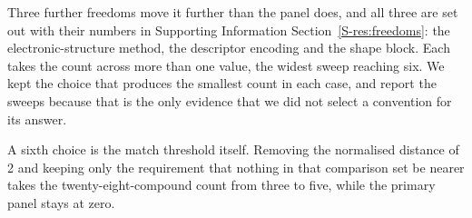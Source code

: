 \documentclass[journal=jacsat,manuscript=article,margin=1in]{achemso}
\begin{document}
Three further freedoms move it further than the panel does, and all three are
set out with their numbers in Supporting Information
Section~\ref{S-res:freedoms}: the electronic-structure method, the descriptor
encoding and the shape block. Each takes the count across more than one value,
the widest sweep reaching six. We kept the choice that produces the smallest
count in each case, and report the sweeps because that is the only evidence
that we did not select a convention for its answer.

A sixth choice is the match threshold itself. Removing the normalised distance
of 2 and keeping only the requirement that nothing in that comparison set
be nearer takes the twenty-eight-compound count from three to five, while the
primary panel stays at zero.
\end{document}
